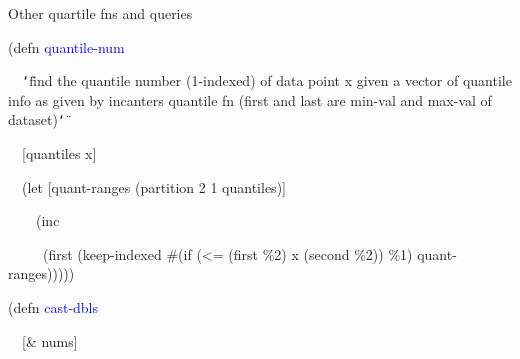 \documentclass{beamer}
\renewcommand{\textquotedbl}{\texttt{\char`\"}}
\begin{document}
\begin{frame}[allowframebreaks]{Other quartile fns and queries}
\begin{small}

{\ttfamily\color{black}
\textcolor[rgb]{0.54901963,0.54901963,0.54901963}{(}\textcolor[rgb]{0.49803922,0.0,0.49803922}{defn}
\textcolor{blue}{quantile-num}}

{\ttfamily\color{black}
\ \ \textcolor[rgb]{0.54509807,0.13333334,0.32156864}{{\textquotedbl}find
the quantile number (1-indexed) of data point x given a vector of
quantile info as given by incanter{\textquotesingle}s quantile fn
(first and last are min-val and max-val of dataset){\textquotedbl}}}

{\ttfamily\color{black}
\ \ [quantiles x]}

{\ttfamily\color{black}
\ \ \textcolor[rgb]{0.54901963,0.54901963,0.54901963}{(}\textcolor[rgb]{0.49803922,0.0,0.49803922}{let}
[quant-ranges
\textcolor[rgb]{0.54901963,0.54901963,0.54901963}{(}\textcolor[rgb]{0.28235295,0.23921569,0.54509807}{partition}
2 1 quantiles\textcolor[rgb]{0.54901963,0.54901963,0.54901963}{)}]}

{\ttfamily\color{black}
\ \ \ \ \textcolor[rgb]{0.54901963,0.54901963,0.54901963}{(}\textcolor[rgb]{0.28235295,0.23921569,0.54509807}{inc}}

{\ttfamily\color{black}
\ \ \ \ \ \textcolor[rgb]{0.54901963,0.54901963,0.54901963}{(}\textcolor[rgb]{0.28235295,0.23921569,0.54509807}{first}
\textcolor[rgb]{0.54901963,0.54901963,0.54901963}{(}keep-indexed
\#\textcolor[rgb]{0.54901963,0.54901963,0.54901963}{(}\textcolor[rgb]{0.49803922,0.0,0.49803922}{if}
\textcolor[rgb]{0.54901963,0.54901963,0.54901963}{(}\textcolor[rgb]{0.28235295,0.23921569,0.54509807}{{\textless}=}
\textcolor[rgb]{0.54901963,0.54901963,0.54901963}{(}\textcolor[rgb]{0.28235295,0.23921569,0.54509807}{first}
\%2\textcolor[rgb]{0.54901963,0.54901963,0.54901963}{)} x
\textcolor[rgb]{0.54901963,0.54901963,0.54901963}{(}\textcolor[rgb]{0.28235295,0.23921569,0.54509807}{second}
\%2\textcolor[rgb]{0.54901963,0.54901963,0.54901963}{))}
\%1\textcolor[rgb]{0.54901963,0.54901963,0.54901963}{)}
quant-ranges\textcolor[rgb]{0.54901963,0.54901963,0.54901963}{)))))}}


\framebreak


{\ttfamily\color{black}
\textcolor[rgb]{0.54901963,0.54901963,0.54901963}{(}\textcolor[rgb]{0.49803922,0.0,0.49803922}{defn}
\textcolor{blue}{cast-dbls}}

{\ttfamily\color{black}
\ \ [\& nums]}


\end{small}
\end{frame}
\end{document}
